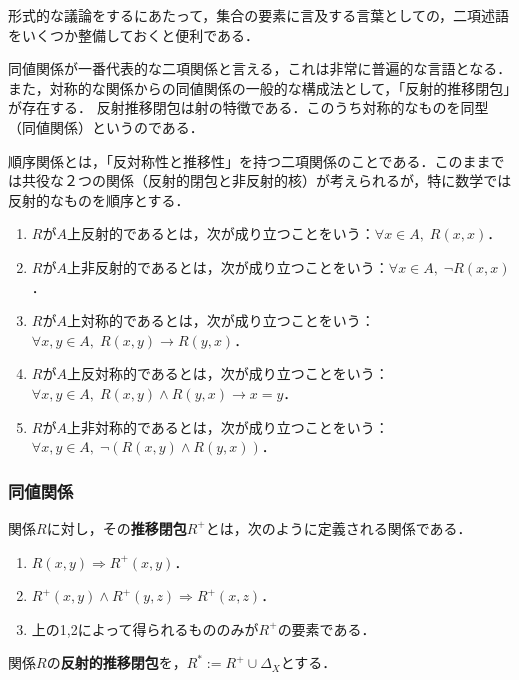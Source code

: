 \documentclass[uplatex, 12pt, dvipdfmx]{jsreport}
\begin{document}
\begin{screen}
    形式的な議論をするにあたって，集合の要素に言及する言葉としての，二項述語をいくつか整備しておくと便利である．

    同値関係が一番代表的な二項関係と言える，これは非常に普遍的な言語となる．また，対称的な関係からの同値関係の一般的な構成法として，「反射的推移閉包」が存在する．
    反射推移閉包は射の特徴である．このうち対称的なものを同型（同値関係）というのである．

    順序関係とは，「反対称性と推移性」を持つ二項関係のことである．このままでは共役な２つの関係（反射的閉包と非反射的核）が考えられるが，特に数学では
    反射的なものを順序とする．
\end{screen}

\begin{definition}\mbox{}
    \begin{enumerate}
        \item $R$が$A$上反射的であるとは，次が成り立つことをいう：$\forall x\in A,\; R(x,x)$．
        \item $R$が$A$上非反射的であるとは，次が成り立つことをいう：$\forall x\in A,\;\lnot R(x,x)$．
        \item $R$が$A$上対称的であるとは，次が成り立つことをいう：$\forall x,y\in A,\;R(x,y)\to R(y,x)$．
        \item $R$が$A$上反対称的であるとは，次が成り立つことをいう：$\forall x,y\in A,\; R(x,y)\land R(y,x)\to x=y$．
        \item $R$が$A$上非対称的であるとは，次が成り立つことをいう：$\forall x,y\in A,\; \lnot(R(x,y)\land R(y,x))$．
    \end{enumerate}
\end{definition}

\subsubsection*{同値関係}

\begin{definition}
    関係$R$に対し，その\textbf{推移閉包}$R^+$とは，次のように定義される関係である．
    \begin{enumerate}
        \item $R(x,y)\Rightarrow R^+(x,y)$．
        \item $R^+(x,y)\land R^+(y,z)\Rightarrow R^+(x,z)$．
        \item 上の1,2によって得られるもののみが$R^+$の要素である．
    \end{enumerate}
    関係$R$の\textbf{反射的推移閉包}を，$R^*:=R^+\cup\Delta_X$とする．
\end{definition}
\end{document}

